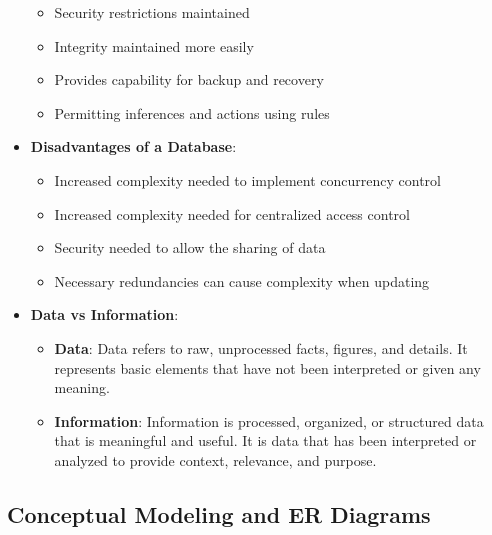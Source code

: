 \documentclass{report}
\begin{document}
\begin{itemize}
\begin{itemize}
                \item Security restrictions maintained
                \item Integrity maintained more easily
                \item Provides capability for backup and recovery
                \item Permitting inferences and actions using rules
            \end{itemize}
        \item \textbf{Disadvantages of a Database}:
            \begin{itemize}
                \item Increased complexity needed to implement concurrency control
                \item Increased complexity needed for centralized access control
                \item Security needed to allow the sharing of data
                \item Necessary redundancies can cause complexity when updating
            \end{itemize}
        \item \textbf{Data vs Information}:
            \begin{itemize}
                \item \textbf{Data}: Data refers to raw, unprocessed facts, figures, and details. It represents basic elements that have not been interpreted or given any meaning.
                \item \textbf{Information}: Information is processed, organized, or structured data that is meaningful and useful. It is data that has been interpreted or analyzed to provide context, relevance, and purpose.
            \end{itemize}
    \end{itemize}

    \pagebreak 
    \subsection{Conceptual Modeling and ER Diagrams}
    \bigbreak \noindent 
\end{document}
